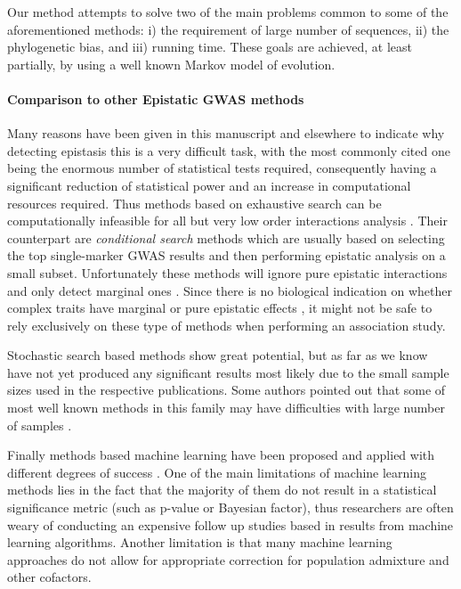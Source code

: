 Our method attempts to solve two of the main problems common to some of the aforementioned methods: 
i) the requirement of large number of sequences, 
ii) the phylogenetic bias, and
iii) running time.
These goals are achieved, at least partially, by using a well known Markov model of evolution.

\paragraph{Comparison to other Epistatic GWAS methods}
Many reasons have been given in this manuscript and elsewhere to indicate why detecting epistasis this is a very difficult task, with the most commonly cited one being the enormous number of statistical tests required, consequently having a significant reduction of statistical power and an increase in computational resources required.
Thus methods based on exhaustive search can be computationally infeasible for all but very low order interactions analysis \cite{cordell2009detecting}.
Their counterpart are \textit{conditional search} methods \cite{li2011detecting} which are usually based on selecting the top single-marker GWAS results and then performing epistatic analysis on a small subset.
Unfortunately these methods will ignore pure epistatic interactions and only detect marginal ones \cite{li2011detecting,cordell2002epistasis}.
Since there is no biological indication on whether complex traits have marginal or pure epistatic effects \cite{culverhouse2002perspective,zuk2012mystery,li2011detecting}, it might not be safe to rely exclusively on these type of methods when performing an  association study.

Stochastic search based methods \cite{zhang2007bayesian} show great potential, but as far as we know have not yet produced any significant results most likely due to the small sample sizes used in the respective publications. 
Some authors pointed out that some of most well known methods in this family may have difficulties with large number of samples \cite{de2013emerging}.

Finally methods based machine learning have been proposed and applied with different degrees of success \cite{koo2013review, cordell2009detecting, li2011detecting}.
One of the main limitations of machine learning methods lies in the fact that the majority of them do not result in a statistical significance metric (such as p-value or Bayesian factor), thus researchers are often weary of conducting an expensive follow up studies based in results from machine learning algorithms.
Another limitation is that many machine learning approaches do not allow for appropriate correction for population admixture and other cofactors.


